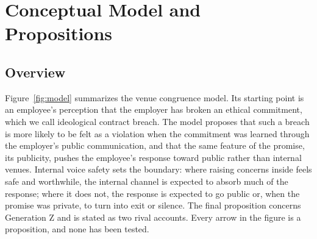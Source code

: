 \section{Conceptual Model and Propositions}
\subsection{Overview}

Figure~\ref{fig:model} summarizes the venue congruence model. Its starting point is an employee's perception that the employer has broken an ethical commitment, which we call ideological contract breach. The model proposes that such a breach is more likely to be felt as a violation when the commitment was learned through the employer's public communication, and that the same feature of the promise, its publicity, pushes the employee's response toward public rather than internal venues. Internal voice safety sets the boundary: where raising concerns inside feels safe and worthwhile, the internal channel is expected to absorb much of the response; where it does not, the response is expected to go public or, when the promise was private, to turn into exit or silence. The final proposition concerns Generation Z and is stated as two rival accounts. Every arrow in the figure is a proposition, and none has been tested.

